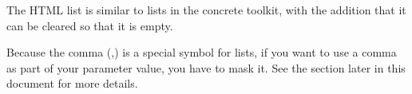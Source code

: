 
The HTML list is similar to lists in the concrete toolkit, with the addition that it can be cleared so that it is empty. 

Because the comma (,) is a special symbol for lists, if you want to use a comma as part of your parameter value, you have to mask it. See the section later in this document  for more details. 
